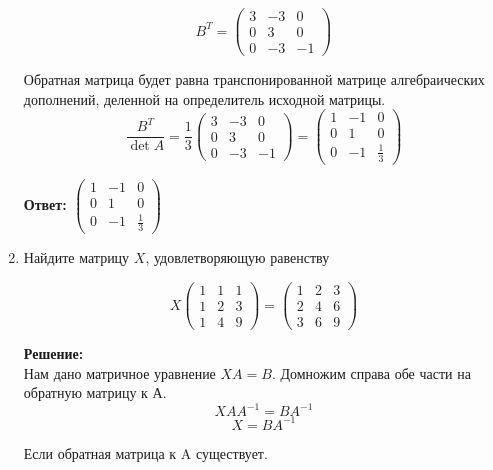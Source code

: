 \documentclass[a4paper,12pt]{article}
\begin{document}
\begin{enumerate}
$$B^T=\begin{pmatrix}
3&-3&0\\
0&3&0\\
0&-3&-1
\end{pmatrix}$$

Обратная матрица будет равна транспонированной матрице алгебраических дополнений, деленной на определитель исходной матрицы.
$$\frac{B^T}{\det A}= \frac{1}{3}\begin{pmatrix}
3&-3&0\\
0&3&0\\
0&-3&-1
\end{pmatrix}= \begin{pmatrix}
1&-1&0\\
0&1&0\\
0&-1&\frac{1}{3}
\end{pmatrix}$$


\textbf{Ответ: 
$\begin{pmatrix}
1&-1&0\\
0&1&0\\
0&-1&\frac{1}{3}
\end{pmatrix}$}

\item
Найдите матрицу $X$, удовлетворяющую равенству

$$
X
\begin{pmatrix}
1&1&1\\
1&2&3\\
1&4&9
\end{pmatrix}
=
\begin{pmatrix}
1&2&3\\
2&4&6\\
3&6&9
\end{pmatrix}
$$

\textbf{Решение:}\\
Нам дано матричное уравнение $XA=B$. Домножим справа обе части на обратную матрицу к А.
$$XAA^{-1} = BA^{-1}$$
$$X = BA^{-1}$$

Если обратная матрица к A существует.


\end{enumerate}
\end{document}
